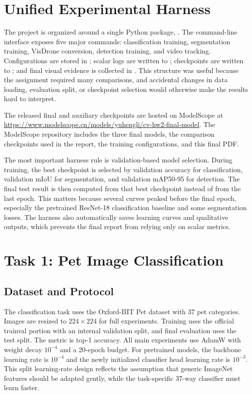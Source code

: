\documentclass[10pt,twocolumn]{article}
\begin{document}
\section{Unified Experimental Harness}

The project is organized around a single Python package, . The command-line interface exposes five major commands: classification training, segmentation training, VisDrone conversion, detection training, and video tracking. Configurations are stored in ; scalar logs are written to ; checkpoints are written to ; and final visual evidence is collected in . This structure was useful because the assignment required many comparisons, and accidental changes in data loading, evaluation split, or checkpoint selection would otherwise make the results hard to interpret.

The released final and auxiliary checkpoints are hosted on ModelScope at \url{https://www.modelscope.cn/models/yuhengli/cv-hw2-final-model}. The ModelScope repository includes the three final models, the comparison checkpoints used in the report, the training configurations, and this final PDF.

The most important harness rule is validation-based model selection. During training, the best checkpoint is selected by validation accuracy for classification, validation mIoU for segmentation, and validation mAP50-95 for detection. The final test result is then computed from that best checkpoint instead of from the last epoch. This matters because several curves peaked before the final epoch, especially the pretrained ResNet-18 classification baseline and some segmentation losses. The harness also automatically saves learning curves and qualitative outputs, which prevents the final report from relying only on scalar metrics.

\section{Task 1: Pet Image Classification}

\subsection{Dataset and Protocol}

The classification task uses the Oxford-IIIT Pet dataset with 37 pet categories. Images are resized to $224 \times 224$ for full experiments. Training uses the official trainval portion with an internal validation split, and final evaluation uses the test split. The metric is top-1 accuracy. All main experiments use AdamW with weight decay $10^{-4}$ and a 20-epoch budget. For pretrained models, the backbone learning rate is $10^{-4}$ and the newly initialized classifier head learning rate is $10^{-3}$. This split learning-rate design reflects the assumption that generic ImageNet features should be adapted gently, while the task-specific 37-way classifier must learn faster.
\end{document}

